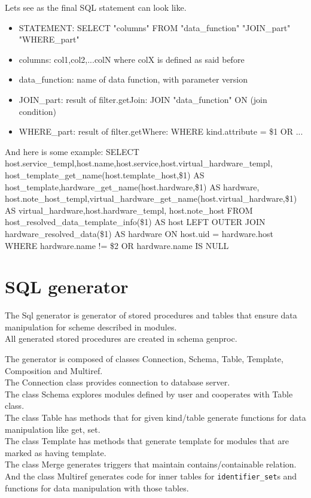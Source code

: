 \documentclass[deska]{subfiles}
\begin{document}
Lets see as the final SQL statement can look like.
\begin{itemize}
\item{STATEMENT}: SELECT "columns" FROM "data\_function" "JOIN\_part" "WHERE\_part"
\item{columns}: col1,col2,...colN where colX is defined as said before
\item{data\_function}: name of data function, with parameter version
\item{JOIN\_part}: result of filter.getJoin: JOIN "data\_function" ON (join condition)
\item{WHERE\_part}: result of filter.getWhere: WHERE kind.attribute = \$1 OR ...
\end{itemize}
And here is some example:
SELECT host.service\_templ,host.name,host.service,host.virtual\_hardware\_templ,
host\_template\_get\_name(host.template\_host,\$1) AS host\_template,hardware\_get\_name(host.hardware,\$1) AS hardware,
host.note\_host\_templ,virtual\_hardware\_get\_name(host.virtual\_hardware,\$1) AS virtual\_hardware,host.hardware\_templ,
host.note\_host FROM host\_resolved\_data\_template\_info(\$1) AS host
LEFT OUTER JOIN hardware\_resolved\_data(\$1) AS hardware ON host.uid = hardware.host
WHERE hardware.name != \$2 OR hardware.name IS NULL 

\section{SQL generator}
\label{sec:sql-generator}

The Sql generator is generator of stored procedures and tables that ensure data manipulation for scheme described in modules.\\
All generated stored procedures are created in schema genproc.

The generator is composed of classes Connection, Schema, Table, Template, Composition and Multiref.\\
The Connection class provides connection to database server.\\
The class Schema explores modules defined by user and cooperates with Table class.\\
The class Table has methods that for given kind/table generate functions for data manipulation like get, set.\\
The class Template has methods that generate template for modules that are marked as having template.\\
The class Merge generates triggers that maintain contains/containable relation.\\
And the class Multiref generates code for inner tables for {\tt identifier\_set}s and functions for data manipulation with those tables.\\
\end{document}
